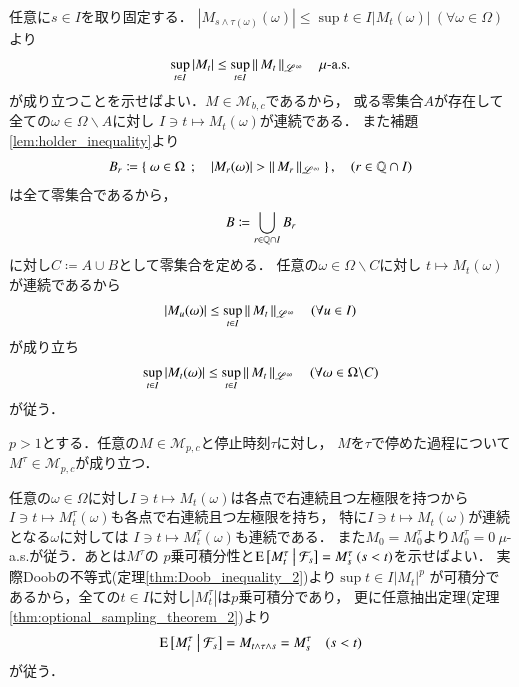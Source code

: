 	\begin{prf}
		任意に$s \in I$を取り固定する．
		$|M_{s \wedge \tau(\omega)}(\omega)| \leq \sup{t \in I}{|M_t(\omega)|}\ (\forall \omega \in \Omega)$より
		\begin{align}
			\operatorname*{sup}_{t \in I} |M_t| \leq \operatorname*{sup}_{t \in I} \left\|\, M_t\, \right\|_{\mathscr{L}^\infty}
			\quad \mbox{$\mu$-a.s.}
		\end{align}
		が成り立つことを示せばよい．$M \in \mathcal{M}_{b,c}$であるから，
		或る零集合$A$が存在して全ての$\omega \in \Omega \backslash A$に対し
		$I \ni t \longmapsto M_t(\omega)$が連続である．
		また補題\ref{lem:holder_inequality}より
		\begin{align}
			B_r \coloneqq \left\{\ \omega \in \Omega\ \, ; \quad |M_r(\omega)| > \left\|\, M_r\, \right\|_{\mathscr{L}^\infty}\ \right\},
			\quad (r \in \mathbb{Q} \cap I)
		\end{align}
		は全て零集合であるから，
		\begin{align}
			B \coloneqq \bigcup_{r \in \mathbb{Q} \cap I} B_r
		\end{align}
		に対し$C \coloneqq A \cup B$として零集合を定める．
		任意の$\omega \in \Omega \backslash C$に対し
		$t \longmapsto M_t(\omega)$が連続であるから
		\begin{align}
			|M_u(\omega)| \leq \operatorname*{sup}_{t \in I} \left\|\, M_t\, \right\|_{\mathscr{L}^\infty}
			\quad (\forall u \in I)
		\end{align}
		が成り立ち
		\begin{align}
			\operatorname*{sup}_{t \in I} |M_t(\omega)| \leq \operatorname*{sup}_{t \in I} \left\|\, M_t\, \right\|_{\mathscr{L}^\infty}
			\quad (\forall \omega \in \Omega \backslash C)
		\end{align}
		が従う．
		\QED
	\end{prf}
	
	\begin{screen}
		\begin{thm}[停止時刻で停めてもマルチンゲール]
			$p > 1$とする．任意の$M \in \mathcal{M}_{p,c}$と停止時刻$\tau$に対し，
			$M$を$\tau$で停めた過程について$M^\tau \in \mathcal{M}_{p,c}$が成り立つ．
			\label{thm:stopped_process_martingale}
		\end{thm}
	\end{screen}
	
	\begin{prf}
		任意の$\omega \in \Omega$に対し$I \ni t \longmapsto M_t(\omega)$は各点で右連続且つ左極限を持つから
		$I \ni t \longmapsto M^{\tau}_t(\omega)$も各点で右連続且つ左極限を持ち，
		特に$I \ni t \longmapsto M_t(\omega)$が連続となる$\omega$に対しては
		$I \ni t \longmapsto M^{\tau}_t(\omega)$も連続である．
		また$M_0 = M^{\tau}_0$より$M^{\tau}_0 = 0\ \mu$-a.s.が従う．あとは$M^{\tau}$の
		$p$乗可積分性と$\operatorname{E} \left[ M^\tau_t \ \middle|\ \mathcal{F}_s \right] = M^\tau_s\ (s < t)$を示せばよい．
		実際Doobの不等式(定理\ref{thm:Doob_inequality_2})より$\sup{t \in I}{|M_t|^p}$
		が可積分であるから，全ての$t \in I$に対し$\left| M^\tau_t \right|$は$p$乗可積分であり，
		更に任意抽出定理(定理\ref{thm:optional_sampling_theorem_2})より
		\begin{align}
			\operatorname{E} \left[ M^\tau_t \ \middle|\ \mathcal{F}_s \right] = M_{t \wedge \tau \wedge s} = M^\tau_s \quad (s < t)
		\end{align}
		が従う．
		\QED
	\end{prf}

